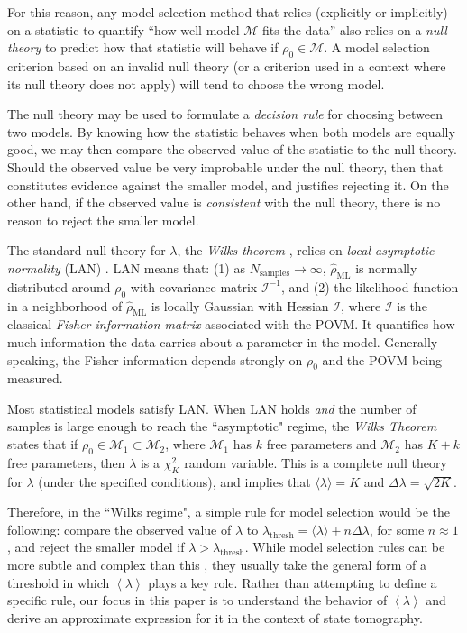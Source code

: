 \documentclass[aps,pra, twocolumn]{revtex4-1}
\newcommand{\M}{\mathcal{M}}
\newcommand{\expect}[1]{\ensuremath{\left\langle#1\right\rangle}}
\newcommand{\Fi}{\mathcal{I}}
\newcommand{\rhohat}{\hat{\rho}}
\begin{document}
For this reason, any model selection method that relies (explicitly or implicitly) on a statistic to quantify ``how well model $\M$ fits the data'' also relies on a \emph{null theory} to predict how that statistic will behave if $\rho_{0} \in \M$.  A model selection criterion based on an invalid null theory (or a criterion used in a context where its null theory does not apply) will tend to choose the wrong model.

The null theory may be used to formulate a \emph{decision rule} for choosing between two models. By knowing how the statistic behaves when both models are equally good, we may then compare the observed value of the statistic to the null theory. Should the observed value be very improbable under the null theory, then that constitutes evidence against the smaller model, and justifies rejecting it. On the other hand, if the observed value is \emph{consistent} with the null theory, there is no reason to reject the smaller model.

The standard null theory for $\lambda$, the \emph{Wilks theorem} \cite{Wilks1938}, relies on \emph{local asymptotic normality} (LAN) \cite{LeCam1970, LeCam1956}. LAN means that: (1) as $N_{\mathrm{samples}}\rightarrow \infty$,  $\rhohat_{\mathrm{ML}}$ is normally distributed around $\rho_{0}$ with covariance matrix $\Fi^{-1}$, and (2) the likelihood function in a neighborhood of $\rhohat_{\mathrm{ML}}$ is locally Gaussian with Hessian $\Fi$, where $\Fi$ is the classical \emph{Fisher information matrix} associated with the POVM. It quantifies how much information the data carries about a parameter in the model. Generally speaking, the Fisher information depends strongly on $\rho_{0}$ and the POVM being measured.

Most statistical models satisfy LAN.  When LAN holds \emph{and} the number of samples is large enough to reach the ``asymptotic" regime, the \emph{Wilks Theorem} states that if $\rho_{0}\in \M_{1}\subset \M_{2}$, where $\M_{1}$ has $k$ free parameters and $\M_{2}$ has $K+k$ free parameters, then $\lambda$ is a $\chi^{2}_{K}$ random variable.  This is a complete null theory for $\lambda$ (under the specified conditions), and implies that $\langle \lambda \rangle = K$ and $\Delta \lambda = \sqrt{2K}$.

Therefore, in the ``Wilks regime", a simple rule for model selection would be the following: compare the observed value of $\lambda$ to $\lambda_{\mathrm{thresh}} = \langle \lambda \rangle + n\Delta \lambda$, for some $n \approx 1$, and reject the smaller model if $\lambda > \lambda_{\mathrm{thresh}}$.  While model selection rules can be more subtle and complex than this , they usually take the general form of a threshold in which $\expect{\lambda}$ plays a key role.  Rather than attempting to define a specific rule, our focus in this paper is to understand the behavior of $\expect{\lambda}$ and derive an approximate expression for it in the context of state tomography.
\end{document}
